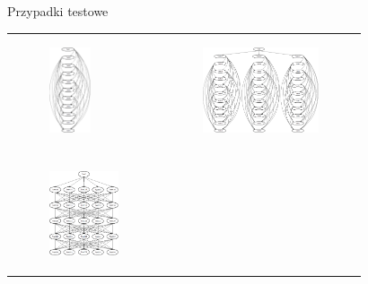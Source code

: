 \documentclass{beamer}
\begin{document}
\begin{frame}{Przypadki testowe}
\begin{table}
     \begin{small}
	\begin{tabular}{ p{4cm} p{6cm} }
	
	\begin{minipage}{.5\textwidth}
\begin{figure}[H]
	\begin{center}
  		\includegraphics[height=2.5cm]{TestA.png}
	\end{center}
\end{figure}
   	 \end{minipage}
   	 &	
	\begin{minipage}{.5\textwidth}
\begin{figure}[H]
	\begin{center}
  		\includegraphics[height=2.5cm]{TestB.png}
	\end{center}
\end{figure}
   	 \end{minipage}
   	 \\ \\
	\begin{minipage}{.5\textwidth}
\begin{figure}[H]
	\begin{center}
  		\includegraphics[height=2.5cm]{TestC.png}

\end{center}
\end{figure}
\end{minipage}
\end{tabular}
\end{small}
\end{table}
\end{frame}
\end{document}
